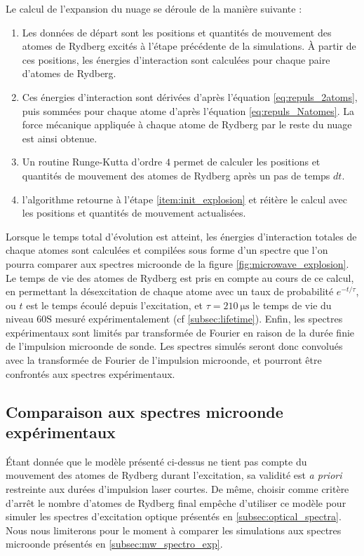 Le calcul de l'expansion du nuage se déroule de la manière suivante :
\begin{enumerate}
\item \label{item:init_explosion}Les données de départ sont les positions et quantités de mouvement des atomes de Rydberg excités à l'étape précédente de la simulations.
\`A partir de ces positions, les énergies d'interaction sont calculées pour chaque paire d'atomes de Rydberg.
\item Ces énergies d'interaction sont dérivées d'après l'équation \eqref{eq:repuls_2atoms}, puis sommées pour chaque atome d'après l'équation \eqref{eq:repuls_Natomes}.
La force mécanique appliquée à chaque atome de Rydberg par le reste du nuage est ainsi obtenue.
\item Un routine Runge-Kutta d'ordre $4$ permet de calculer les positions et quantités de mouvement des atomes de Rydberg après un pas de temps $dt$.
\item l'algorithme retourne à l'étape \ref{item:init_explosion} et réitère le calcul avec les positions et quantités de mouvement actualisées.
\end{enumerate}
Lorsque le temps total d'évolution est atteint, les énergies d'interaction totales de chaque atomes sont calculées et compilées sous forme d'un spectre que l'on pourra comparer aux spectres microonde de la figure \eqref{fig:microwave_explosion}.
Le temps de vie des atomes de Rydberg est pris en compte au cours de ce calcul, en permettant la désexcitation de chaque atome avec un taux de probabilité $e^{-t/\tau}$, ou $t$ est le temps écoulé depuis l'excitation, et $\tau = \SI{210}{\us}$ le temps de vie du niveau $\mathrm{60S}$ mesuré expérimentalement (cf \ref{subsec:lifetime}).
Enfin, les spectres expérimentaux sont limités par transformée de Fourier en raison de la durée finie de l'impulsion microonde de sonde.
Les spectres simulés seront donc convolués avec la transformée de Fourier de l'impulsion microonde, et pourront être confrontés aux spectres expérimentaux.

\subsection{Comparaison aux spectres microonde expérimentaux}
\noindent Étant donnée que le modèle présenté ci-dessus ne tient pas compte du mouvement des atomes de Rydberg durant l'excitation, sa validité est \textit{a priori} restreinte aux durées d'impulsion laser courtes.
De même, choisir comme critère d'arrêt le nombre d'atomes de Rydberg final empêche d'utiliser ce modèle pour simuler les spectres d'excitation optique présentés en \ref{subsec:optical_spectra}.
Nous nous limiterons pour le moment à comparer les simulations aux spectres microonde présentés en \ref{subsec:mw_spectro_exp}.

